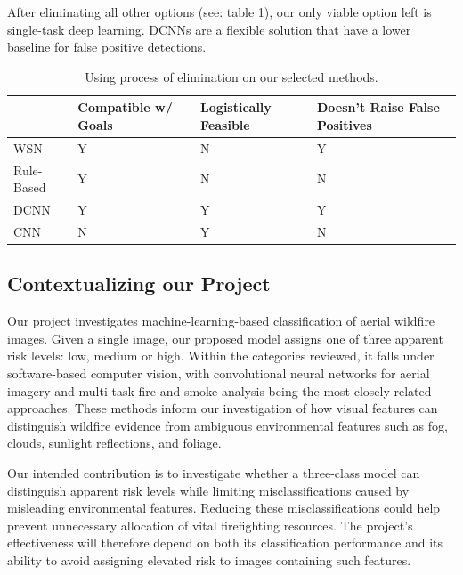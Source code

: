 \documentclass[sigconf]{acmart}
\begin{document}
After eliminating all other options (see: table 1), our only viable option left is single-task deep learning. DCNNs are a flexible solution that have a lower baseline for false positive detections. 

\begin{table}[]
\centering
\begin{tabularx}{\columnwidth}{X|X|X|X}
\hline
 & Compatible w/ Goals & Logistically Feasible & Doesn't Raise False Positives \\ \hline
WSN & Y & N & Y \\
Rule-Based & Y & N & N \\
DCNN & Y & Y & Y \\
CNN & N & Y & N \\ \hline
\end{tabularx}
\caption{Using process of elimination on our selected methods.}
\end{table}

\subsection{Contextualizing our Project}
Our project investigates machine-learning-based classification of aerial wildfire images. Given a single image, our proposed model assigns one of three apparent risk levels: low, medium or high. Within the categories reviewed, it falls under software-based computer vision, with convolutional neural networks for aerial imagery and multi-task fire and smoke analysis being the most closely related approaches. These methods inform our investigation of how visual features can distinguish wildfire evidence from ambiguous environmental features such as fog, clouds, sunlight reflections, and foliage.

Our intended contribution is to investigate whether a three-class model can distinguish apparent risk levels while limiting misclassifications caused by misleading environmental features. Reducing these misclassifications could help prevent unnecessary allocation of vital firefighting resources. The project's effectiveness will therefore depend on both its classification performance and its ability to avoid assigning elevated risk to images containing such features. 
\end{document}
